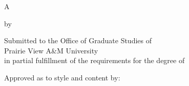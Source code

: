 %
%
%


\begin{titlepage}
\begin{center}

\vspace*{12 pt}
\MakeUppercase{\pvamumanuscripttitle}

\vspace{18 pt}
A \pvamupapertype

by

\MakeUppercase{\pvamufullname}

\vspace{18 pt}

\begin{singlespace}
Submitted to the Office of Graduate Studies of \\
Prairie View A\&M University \\
in partial fulfillment of the requirements for the degree of\\
\end{singlespace}

\vspace{12 pt}
\MakeUppercase{\pvamudegree}

\vspace{12 pt}

\end{center}

\begin{singlespace}
\hspace*{1ex} Approved as to style and content by:
\vspace{18 pt}
\newcommand{\specialcell}[2][l]{%
  \begin{tabular}[#1]{@{}l@{}}#2\end{tabular}}


\end{singlespace}
\end{titlepage}
